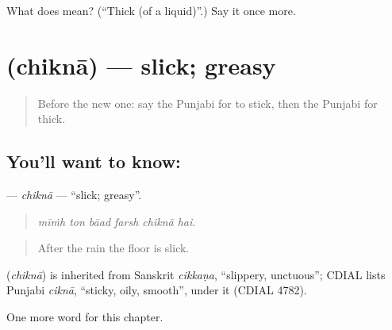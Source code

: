 \begin{tcolorbox}[breakable,colback=teal!4,colframe=teal!35!black,title={Before you move on}]
What does  mean? (\textquotedblleft{}Thick (of a liquid)\textquotedblright{}.) Say it once more.
\end{tcolorbox}
\section[\texorpdfstring{\pa{ਚਿਕਨਾ} (chiknā)}{ਚਿਕਨਾ (chiknā)}]{ (chiknā) — slick; greasy}

\label{lesson:PA-C296-chikna}



\begin{quote}
Before the new one: say the Punjabi for to stick, then the Punjabi for thick.
\end{quote}

\subsection*{You'll want to know: }
\textbf{} — \emph{chiknā} — \textquotedblleft{}slick; greasy\textquotedblright{}.

\begin{quote}
     
\end{quote}

\begin{quote}
\emph{mīṁh ton bāad farsh chiknā hai.}
\end{quote}

\begin{quote}
After the rain the floor is slick.
\end{quote}

\begin{cousinweb}
\textbf{} (\emph{chiknā}) is inherited from Sanskrit \emph{cikkaṇa}, \textquotedblleft{}slippery, unctuous\textquotedblright{}; CDIAL lists Punjabi \emph{ciknā}, \textquotedblleft{}sticky, oily, smooth\textquotedblright{}, under it (CDIAL 4782).
\end{cousinweb}

\begin{grammarlens}[title={What you've built}]
One more word for this chapter.
\end{grammarlens}


